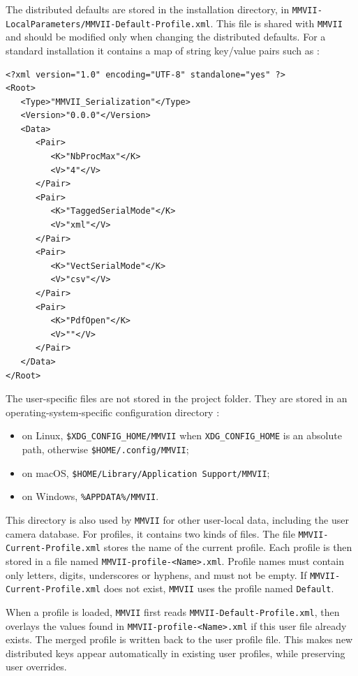 The distributed defaults are stored in the installation directory, in
{\tt MMVII-LocalParameters/MMVII-Default-Profile.xml}. This file is shared with
{\tt MMVII} and should be modified only when changing the distributed defaults.
For a standard installation it contains a map of string key/value pairs such as :

\begin{verbatim}
<?xml version="1.0" encoding="UTF-8" standalone="yes" ?>
<Root>
   <Type>"MMVII_Serialization"</Type>
   <Version>"0.0.0"</Version>
   <Data>
      <Pair>
         <K>"NbProcMax"</K>
         <V>"4"</V>
      </Pair>
      <Pair>
         <K>"TaggedSerialMode"</K>
         <V>"xml"</V>
      </Pair>
      <Pair>
         <K>"VectSerialMode"</K>
         <V>"csv"</V>
      </Pair>
      <Pair>
         <K>"PdfOpen"</K>
         <V>""</V>
      </Pair>
   </Data>
</Root>
\end{verbatim}

The user-specific files are not stored in the project folder. They are stored in
an operating-system-specific configuration directory :

\begin{itemize}
    \item on Linux, {\tt \$XDG\_CONFIG\_HOME/MMVII} when
          {\tt XDG\_CONFIG\_HOME} is an absolute path, otherwise
          {\tt \$HOME/.config/MMVII};
    \item on macOS, {\tt \$HOME/Library/Application Support/MMVII};
    \item on Windows, {\tt \%APPDATA\%/MMVII}.
\end{itemize}

This directory is also used by {\tt MMVII} for other user-local data, including the user camera database. For profiles, it contains two kinds of files. The file
{\tt MMVII-Current-Profile.xml} stores the name of the current profile. Each
profile is then stored in a file named {\tt MMVII-profile-<Name>.xml}. Profile
names must contain only letters, digits, underscores or hyphens, and must not be
empty. If {\tt MMVII-Current-Profile.xml} does not exist, {\tt MMVII} uses the
profile named {\tt Default}.

When a profile is loaded, {\tt MMVII} first reads
{\tt MMVII-Default-Profile.xml}, then overlays the values found in
{\tt MMVII-profile-<Name>.xml} if this user file already exists. The merged
profile is written back to the user profile file. This makes new distributed keys
appear automatically in existing user profiles, while preserving user overrides.

